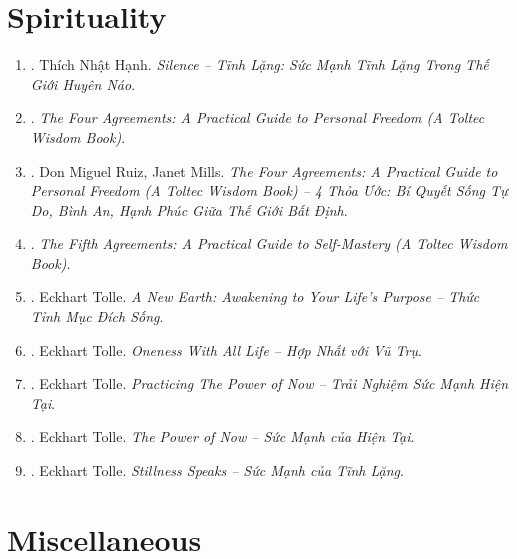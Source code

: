 \documentclass{article}
\begin{document}

\section{Spirituality}

\begin{enumerate}
	\item \cite{Hanh_silence}. Thích Nhật Hạnh. \textit{Silence -- Tĩnh Lặng: Sức Mạnh Tĩnh Lặng Trong Thế Giới Huyên Náo}.\hfill{\sf[finished]}
	\item \cite{Ruiz2011}. \textit{The Four Agreements: A Practical Guide to Personal Freedom (A Toltec Wisdom Book)}.\hfill{\sf[finished]}
	\item \cite{Ruiz_Mills2022}. Don Miguel Ruiz, Janet Mills. \textit{The Four Agreements: A Practical Guide to Personal Freedom (A Toltec Wisdom Book) -- 4 Thỏa Ước: Bí Quyết Sống Tự Do, Bình An, Hạnh Phúc Giữa Thế Giới Bất Định}.\hfill{\sf[finished]}
	\item \cite{Ruiz_Ruiz2011}. \textit{The Fifth Agreements: A Practical Guide to Self-Mastery (A Toltec Wisdom Book)}.\hfill{\sf[finished]}
	\item \cite{Tolle2021d}. Eckhart Tolle. \textit{A New Earth: Awakening to Your Life's Purpose -- Thức Tỉnh Mục Đích Sống}.\hfill{\sf[finished]}
	\item \cite{Tolle2021a}. Eckhart Tolle. \textit{Oneness With All Life -- Hợp Nhất với Vũ Trụ}.\hfill{\sf[finished]}
	\item \cite{Tolle2021b}. Eckhart Tolle. \textit{Practicing The Power of Now -- Trải Nghiệm Sức Mạnh Hiện Tại}.\hfill{\sf[finished]}
	\item \cite{Tolle2021c}. Eckhart Tolle. \textit{The Power of Now -- Sức Mạnh của Hiện Tại}.\hfill{\sf[finished]}
	\item \cite{Tolle2022}. Eckhart Tolle. \textit{Stillness Speaks -- Sức Mạnh của Tĩnh Lặng}.\hfill{\sf[finished]}
\end{enumerate}


\section{Miscellaneous}
\end{document}
